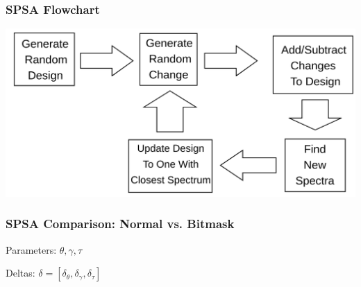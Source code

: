 \documentclass{beamer}
\begin{document}
\begin{frame}
\frametitle{SPSA Flowchart}
    \centering
    \includegraphics[width=1.02\textwidth,height=1.4\textheight,keepaspectratio]{Flowchart.png}
\end{frame}
\begin{frame}
\frametitle{SPSA Comparison: Normal vs. Bitmask}

Parameters: $\theta, \gamma, \tau$

Deltas: $\delta = [\delta_\theta, \delta_\gamma, \delta_\tau]$

\begin{table}
\centering
{}
\end{table}

\end{frame}
\end{document}
